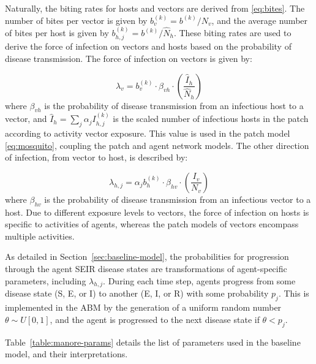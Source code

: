 Naturally, the biting rates for hosts and vectors are derived from \eqref{eq:bites}. The number of bites per vector is given by $b^{(k)}_v=b^{(k)}/N_v$, and the average number of bites per host is given by $b_{h,j}^{(k)}=b^{(k)}/\hat{N}_h$. These biting rates are used to derive the force of infection on vectors and hosts based on the probability of disease transmission. The force of infection on vectors is given by:

\begin{equation}
    \lambda_v=b^{(k)}_v\cdot \beta_{vh}\cdot \left( \frac{\hat{I}_h}{\hat{N}_h} \right)
\end{equation}
where $\beta_{vh}$ is the probability of disease transmission from an infectious host to a vector, and $\hat{I}_h=\sum_j{\alpha_j I^{(k)}_{h,j}}$ is the scaled number of infectious hosts in the patch according to activity vector exposure. This value is used in the patch model \eqref{eq:mosquito}, coupling the patch and agent network models. The other direction of infection, from vector to host, is described by:

\begin{equation}
    \lambda_{h,j}=\alpha_jb^{(k)}_h\cdot \beta_{hv} \cdot \left(\frac{I_v}{N_v}\right)
\end{equation}
where $\beta_{hv}$ is the probability of disease transmission from an infectious vector to a host. Due to different exposure levels to vectors, the force of infection on hosts is specific to activities of agents, whereas the patch models of vectors encompass multiple activities.


As detailed in Section~\ref{sec:baseline-model}, the probabilities for progression through the agent SEIR disease states are transformations of agent-specific parameters, including $\lambda_{h,j}$. During each time step, agents progress from some disease state (S, E, or I) to another (E, I, or R) with some probability $p_j$. This is implemented in the ABM by the generation of a uniform random number $\theta\sim U[0,1]$, and the agent is progressed to the next disease state if $\theta < p_j$.

Table~\ref{table:manore-params} details the list of parameters used in the baseline model, and their interpretations.


